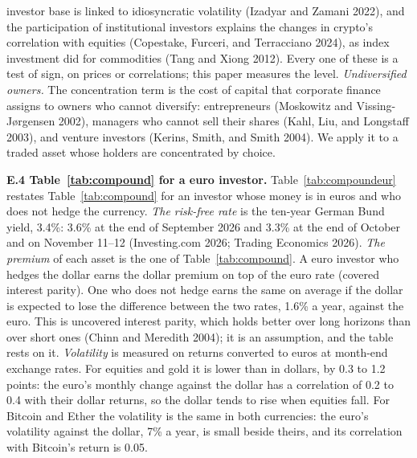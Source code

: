 \documentclass[11pt]{article}
\begin{document}
investor base is linked to idiosyncratic volatility (Izadyar and Zamani 2022), and the participation of institutional investors explains the changes in crypto's correlation with equities (Copestake, Furceri, and Terracciano 2024), as index investment did for commodities (Tang and Xiong 2012). Every one of these is a test of sign, on prices or correlations; this paper measures the level. \emph{Undiversified owners.} The concentration term is the cost of capital that corporate finance assigns to owners who cannot diversify: entrepreneurs (Moskowitz and Vissing-J\o rgensen 2002), managers who cannot sell their shares (Kahl, Liu, and Longstaff 2003), and venture investors (Kerins, Smith, and Smith 2004). We apply it to a traded asset whose holders are concentrated by choice.

\textbf{E.4 Table~\ref{tab:compound} for a euro investor.} Table~\ref{tab:compoundeur} restates Table~\ref{tab:compound} for an investor whose money is in euros and who does not hedge the currency. \emph{The risk-free rate} is the ten-year German Bund yield, 3.4\%: 3.6\% at the end of September 2026 and 3.3\% at the end of October and on November 11--12 (Investing.com 2026; Trading Economics 2026). \emph{The premium} of each asset is the one of Table~\ref{tab:compound}. A euro investor who hedges the dollar earns the dollar premium on top of the euro rate (covered interest parity). One who does not hedge earns the same on average if the dollar is expected to lose the difference between the two rates, 1.6\% a year, against the euro. This is uncovered interest parity, which holds better over long horizons than over short ones (Chinn and Meredith 2004); it is an assumption, and the table rests on it. \emph{Volatility} is measured on returns converted to euros at month-end exchange rates. For equities and gold it is lower than in dollars, by 0.3 to 1.2 points: the euro's monthly change against the dollar has a correlation of 0.2 to 0.4 with their dollar returns, so the dollar tends to rise when equities fall. For Bitcoin and Ether the volatility is the same in both currencies: the euro's volatility against the dollar, 7\% a year, is small beside theirs, and its correlation with Bitcoin's return is 0.05.
\end{document}
